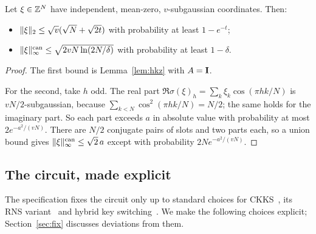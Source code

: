 \begin{lemma}\label{lem:randnorm}
Let $\xi\in\mathbb{Z}^N$ have independent, mean-zero, $v$-subgaussian coordinates. Then:
\begin{itemize}[nosep]
  \item $\lVert \xi\rVert_2\le\sqrt v(\sqrt N+\sqrt{2t})$ with probability at least $1-e^{-t}$;
  \item $\lVert \xi\rVert^{\mathrm{can}}_{\infty}\le\sqrt{2vN\ln(2N/\delta)}$ with probability at least $1-\delta$.
\end{itemize}
\end{lemma}
\begin{proof}
The first bound is Lemma~\ref{lem:hkz} with $A=\mathbf{I}$.

For the second, take $h$ odd. The real part $\Re\sigma(\xi)_h=\sum_k\xi_k\cos(\pi hk/N)$ is $vN/2$-subgaussian, because $\sum_{k<N}\cos^2(\pi hk/N)=N/2$; the same holds for the imaginary part. So each part exceeds $a$ in absolute value with probability at most $2e^{-a^2/(vN)}$. There are $N/2$ conjugate pairs of slots and two parts each, so a union bound gives $\lVert \xi\rVert^{\mathrm{can}}_{\infty}\le\sqrt2\,a$ except with probability $2Ne^{-a^2/(vN)}$.
\end{proof}

\subsection{The circuit, made explicit}
\label{sec:model}

The specification fixes the circuit only up to standard choices for CKKS~\cite{CKKS17}, its RNS variant~\cite{CHKKS18} and hybrid key switching~\cite{HK20}. We make the following choices explicit; Section~\ref{sec:fix} discusses deviations from them.

